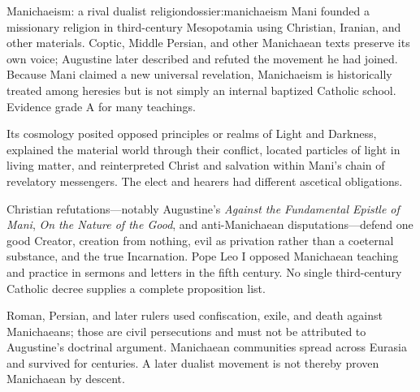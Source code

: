 \begin{heresydossier}{Manichaeism: a rival dualist religion}{dossier:manichaeism}
\objectfield Mani founded a missionary religion in third-century Mesopotamia using Christian, Iranian, and other materials. Coptic, Middle Persian, and other Manichaean texts preserve its own voice; Augustine later described and refuted the movement he had joined. Because Mani claimed a new universal revelation, Manichaeism is historically treated among heresies but is not simply an internal baptized Catholic school. Evidence grade A for many teachings.

\propositionfield Its cosmology posited opposed principles or realms of Light and Darkness, explained the material world through their conflict, located particles of light in living matter, and reinterpreted Christ and salvation within Mani's chain of revelatory messengers. The elect and hearers had different ascetical obligations.

\responsefield Christian refutations---notably Augustine's \emph{Against the Fundamental Epistle of Mani}, \emph{On the Nature of the Good}, and anti-Manichaean disputations---defend one good Creator, creation from nothing, evil as privation rather than a coeternal substance, and the true Incarnation. Pope Leo I opposed Manichaean teaching and practice in sermons and letters in the fifth century. No single third-century Catholic decree supplies a complete proposition list.

\aftermathfield Roman, Persian, and later rulers used confiscation, exile, and death against Manichaeans; those are civil persecutions and must not be attributed to Augustine's doctrinal argument. Manichaean communities spread across Eurasia and survived for centuries. A later dualist movement is not thereby proven Manichaean by descent.
\end{heresydossier}
